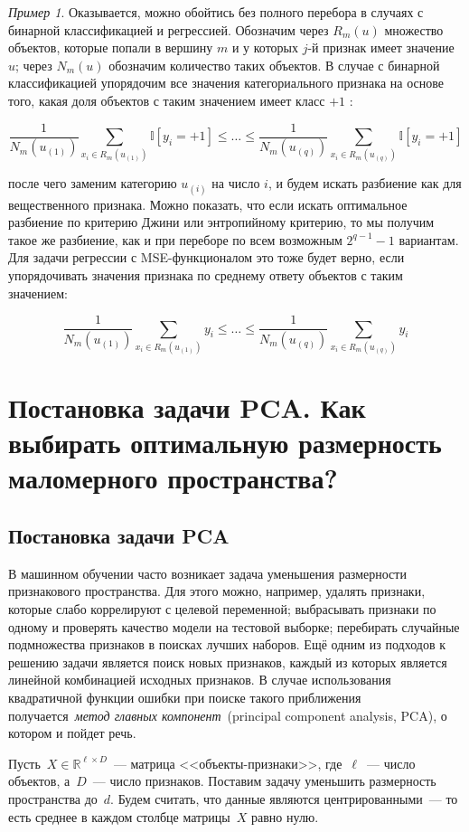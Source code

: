 \documentclass[a4paper, 12pt]{article}
\theoremstyle{plain} %
\theoremstyle{definition} %
\theoremstyle{remark} %
\newtheorem{example}{Пример}
\begin{document}
\begin{example}
Оказывается, можно обойтись без полного перебора в случаях с бинарной классификацией и регрессией. Обозначим через $  R_m (u) $
множество объектов, которые
попали в вершину $ m $
и у которых $ j $-й признак имеет значение $ u $; через $N_m(u) $
обозначим количество таких объектов.
В случае с бинарной классификацией упорядочим все значения категориального признака на основе того, какая доля объектов с таким значением имеет класс $ +1 $ :

\[
\dfrac{1}{N_m(u_{(1)})} \sum_{x_i \in R_m(u_{(1)})} \mathbb{I}[y_i = +1] \le \dots \le \dfrac{1}{N_m(u_{(q)})} \sum_{x_i \in R_m(u_{(q)})} \mathbb{I}[y_i = +1]
\]

после чего заменим категорию $ u_{(i)} $
на число $ i $, и будем искать разбиение как для вещественного признака. Можно показать, что если искать оптимальное разбиение по
критерию Джини или энтропийному критерию, то мы получим такое же разбиение,
как и при переборе по всем возможным $ 2^{q-1} - 1 $
вариантам.
Для задачи регрессии с MSE-функционалом это тоже будет верно, если упорядочивать значения признака по среднему ответу объектов с таким значением:

\[
\dfrac{1}{N_m(u_{(1)})} \sum_{x_i \in R_m(u_{(1)})} y_i \le \dots \le \dfrac{1}{N_m(u_{(q)})} \sum_{x_i \in R_m(u_{(q)})} y_i
\]


\section{Постановка задачи PCA. Как выбирать оптимальную размерность маломерного пространства?}

\subsection{Постановка задачи PCA}

В машинном обучении часто возникает задача уменьшения размерности
признакового пространства.
Для этого можно, например, удалять признаки, которые слабо коррелируют с целевой переменной;
выбрасывать признаки по одному и проверять качество модели на тестовой выборке;
перебирать случайные подмножества признаков в поисках лучших наборов.
Ещё одним из подходов к решению задачи является поиск новых признаков,
каждый из которых является линейной комбинацией исходных признаков.
В случае использования квадратичной функции ошибки при поиске
такого приближения получается~\emph{метод главных компонент}~(principal
component analysis, PCA),
о котором и пойдет речь.

Пусть~$X \in \mathbb{R}^{\ell \times D}$~--- матрица <<объекты-признаки>>,
где~$\ell$~--- число объектов, а~$D$~--- число признаков.
Поставим задачу уменьшить размерность пространства до~$d$.
Будем считать, что данные являются центрированными~--- то есть среднее
в каждом столбце матрицы~$X$ равно нулю.


\end{example}
\end{document}
